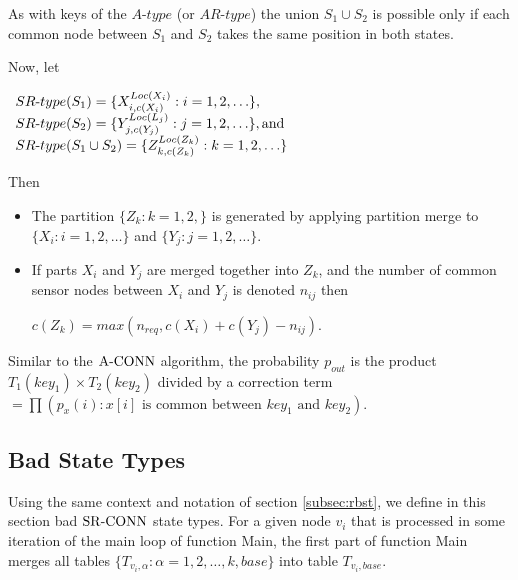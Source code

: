 As  with keys of the $A\mbox{-}type$ (or $AR\mbox{-}type$) the union $S_1 \cup S_2$ is possible only if each common node between $S_1$ and $S_2$ takes the same position in both states.

Now, let
\begin{center}
$\begin{array}[t]{l}
SR\mbox{-}type(S_1)=\{X_{i,c(X_i)}^{Loc(X_i)} : i=1,2, \ldots\},\\

SR\mbox{-}type(S_2)=\{Y_{j,c(Y_j)}^{Loc(L_j)} : j=1,2, \ldots\}, \mbox{and}\\
SR\mbox{-}type(S_1\cup S_2)=\{Z_{k,c(Z_k)}^{Loc(Z_k)} : k=1,2, \ldots\}\end{array}$\\
\end{center}

Then 
\begin{itemize}[noitemsep]
\item The partition $\{Z_k:k=1,2,\}$ is generated by applying partition merge to $\{X_i:i=1,2,\ldots\}$ and $\{Y_j:j=1,2,\ldots\}$.
\item If parts $X_i$ and $Y_j$ are merged together into $Z_k$, and the number of common sensor nodes between $X_i$ and $Y_j$ is denoted $n_{ij}$ then\\
\nwline
\centerline{
$c(Z_k)=max(n_{req},c(X_i)+c(Y_j)-n_{ij})$.
	}
\end{itemize}
Similar to the ${\mathrm {A\mbox{-}CONN}}$ algorithm, the probability $p_{out}$ is the product $T_1(key_1) \times T_2(key_2)$ divided by a correction term  $=\prod (p_x(i):x[i] \mbox{ is common between } key_1 \mbox{ and } key_2)$.

\subsection{Bad State Types}
\label{subsec:bst}

Using the same context and notation of section \ref{subsec:rbst}, we define in this section bad ${\mathrm {SR\mbox{-}CONN}}$ state types. For a given node $v_i$ that is processed  in some iteration of the main loop of function Main, the first part of function Main merges all tables $\{T_{v_i,\alpha} :\alpha=1,2, \ldots,k,base\}$ into table $T_{v_i,base}$.

